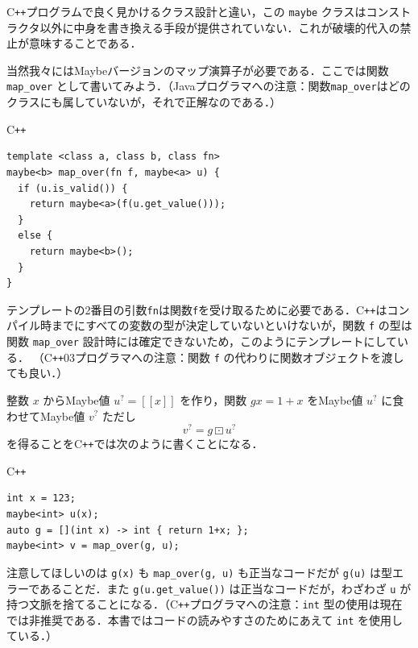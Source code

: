 \documentclass[a4paper,twocolumn]{jsbook}
\def\[{\left[\!\left[}
\def\]{\right]\!\right]}
\newcommand{\programminglanguage}[1]{\textsf{#1}}
\newcommand{\cxx}{\programminglanguage{C}\texttt{++}}
\newcommand{\cxxzerothree}{\cxx\programminglanguage{03}}
\newcommand{\java}{\programminglanguage{Java}}
\newcommand{\code}[1]{\texttt{#1}}
\newenvironment{cxxcode}{\begin{itembox}[r]{\cxx}}{\end{itembox}}
\DeclareMathOperator{\mMapMaybe}{\boxdot}
\newcommand{\mMaybeWith}[1]{\[#1\]}
\newcommand{\mMaybe}[1]{{#1}^\text{?}}
\begin{document}
\cxx プログラムで良く見かけるクラス設計と違い，この \code{maybe} クラスはコンストラクタ以外に中身を書き換える手段が提供されていない．これが破壊的代入の禁止が意味することである．

当然我々にはMaybeバージョンのマップ演算子が必要である．ここでは関数 \code{map\_over} として書いてみよう．（\java プログラマへの注意：関数\code{map\_over}はどのクラスにも属していないが，それで正解なのである．）
\begin{cxxcode}
\begin{verbatim}
template <class a, class b, class fn>
maybe<b> map_over(fn f, maybe<a> u) {
  if (u.is_valid()) {
    return maybe<a>(f(u.get_value()));
  }
  else {
    return maybe<b>();
  }
}
\end{verbatim}
\end{cxxcode}
テンプレートの2番目の引数\code{fn}は関数\code{f}を受け取るために必要である．\cxx はコンパイル時までにすべての変数の型が決定していないといけないが，関数 \code{f} の型は関数 \code{map\_over} 設計時には確定できないため，このようにテンプレートにしている．
（\cxxzerothree プログラマへの注意：関数 \code{f} の代わりに関数オブジェクトを渡しても良い．）

整数 $x$ からMaybe値 $\mMaybe{u}=\mMaybeWith{x}$ を作り，関数 $gx=1+x$ をMaybe値 $\mMaybe{u}$ に食わせてMaybe値 $\mMaybe{v}$ ただし
\begin{equation}
\mMaybe{v}=g\mMapMaybe\mMaybe{u}
\end{equation}
を得ることを\cxx では次のように書くことになる．
\begin{cxxcode}
\begin{verbatim}
int x = 123;
maybe<int> u(x);
auto g = [](int x) -> int { return 1+x; };
maybe<int> v = map_over(g, u);
\end{verbatim}
\end{cxxcode}
注意してほしいのは \code{g(x)} も \code{map\_over(g, u)} も正当なコードだが \code{g(u)} は型エラーであることだ．また \code{g(u.get\_value())} は正当なコードだが，わざわざ \code{u} が持つ文脈を捨てることになる．（\cxx プログラマへの注意：\code{int} 型の使用は現在では非推奨である．本書ではコードの読みやすさのためにあえて \code{int} を使用している．）

\end{document}
